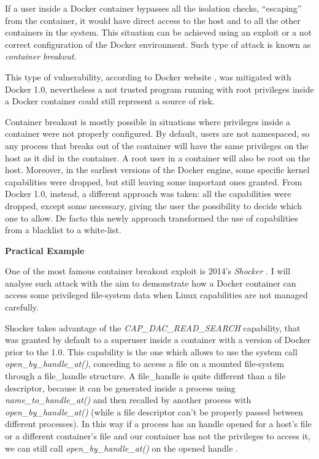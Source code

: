 \documentclass[a4paper,12pt]{article}
\begin{document}
If a user inside a Docker container bypasses all the isolation checks,
``escaping'' from the container, it would have direct access to the host and to
all the other containers in the system. This situation can be achieved using an
exploit or a not correct configuration of the Docker environment. Such type of
attack is known as \textit{container breakout}.\par This type of vulnerability,
according to Docker website \cite{docker_blog_about_container_breakout}, was
mitigated with Docker 1.0, nevertheless a not trusted program running with root
privileges inside a Docker container could still represent a source of risk.
\par Container breakout is mostly possible in situations where privileges inside
a container were not properly configured. By default, users are not namespaced,
so any process that breaks out of the container will have the same privileges on
the host as it did in the container. A root user in a container will also be
root on the host. Moreover, in the earliest versions of the Docker engine, some
specific kernel capabilities were dropped, but still leaving some important ones
granted. From Docker 1.0, instead, a different approach was taken: all the
capabilities were dropped, except some necessary, giving the user the
possibility to decide which one to allow. De facto this newly approach
transformed the use of capabilities from a blacklist to a white-list.

\bigbreak\textbf{Practical Example}\bigbreak 

One of the most famous container breakout exploit is 2014's \textit{Shocker}
\cite{shocker}. I will analyse such attack with the aim to demonstrate how a
Docker container can access some privileged file-system data when Linux
capabilities are not managed carefully.\par Shocker takes advantage of the
\textit{CAP\_DAC\_READ\_SEARCH} capability, that was granted by default to a
superuser inside a container with a version of Docker prior to the 1.0. This
capability is the one which allows to use the system call
\textit{open\_by\_handle\_at()}, conceding to access a file on a mounted
file-system through a file\_handle structure. A file\_handle is quite different
than a file descriptor, because it can be generated inside a process using
\textit{name\_to\_handle\_at()} and then recalled by another process with
\textit{open\_by\_handle\_at()} (while a file descriptor can't be properly
passed between different processes). In this way if a process has an handle
opened for a host's file or a different container's file and our container has
not the privileges to access it, we can still call
\textit{open\_by\_handle\_at()} on the opened handle
\cite{shocker_how_it_works}.
\end{document}
